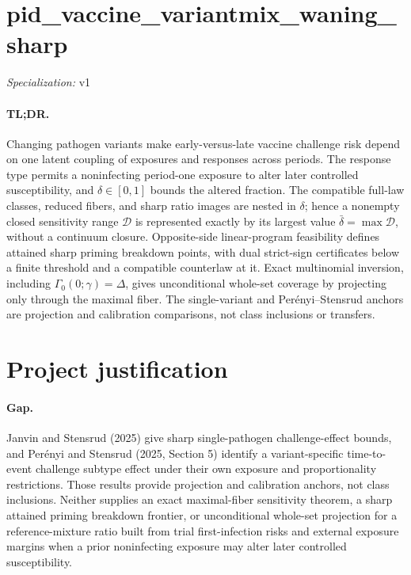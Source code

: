 \documentclass{article}
\begin{document}
\sloppy

\section*{pid\_\allowbreak{}vaccine\_\allowbreak{}variantmix\_\allowbreak{}waning\_\allowbreak{}sharp}

\noindent\textit{Specialization:} v1\par

\paragraph{TL;DR.} Changing pathogen variants make early-versus-late vaccine challenge risk depend on one latent coupling of exposures and responses across periods. The response type permits a noninfecting period-one exposure to alter later controlled susceptibility, and \(\delta\in[0,1]\) bounds the altered fraction. The compatible full-law classes, reduced fibers, and sharp ratio images are nested in \(\delta\); hence a nonempty closed sensitivity range \(\mathcal D\) is represented exactly by its largest value \(\bar\delta=\max\mathcal D\), without a continuum closure. Opposite-side linear-program feasibility defines attained sharp priming breakdown points, with dual strict-sign certificates below a finite threshold and a compatible counterlaw at it. Exact multinomial inversion, including \(\Gamma_0(0;\gamma)=\Delta\), gives unconditional whole-set coverage by projecting only through the maximal fiber. The single-variant and Perényi--Stensrud anchors are projection and calibration comparisons, not class inclusions or transfers.

\section{Project justification}

\paragraph{Gap.} Janvin and Stensrud (2025) give sharp single-pathogen challenge-effect bounds, and Perényi and Stensrud (2025, Section 5) identify a variant-specific time-to-event challenge subtype effect under their own exposure and proportionality restrictions. Those results provide projection and calibration anchors, not class inclusions. Neither supplies an exact maximal-fiber sensitivity theorem, a sharp attained priming breakdown frontier, or unconditional whole-set projection for a reference-mixture ratio built from trial first-infection risks and external exposure margins when a prior noninfecting exposure may alter later controlled susceptibility.
\end{document}
